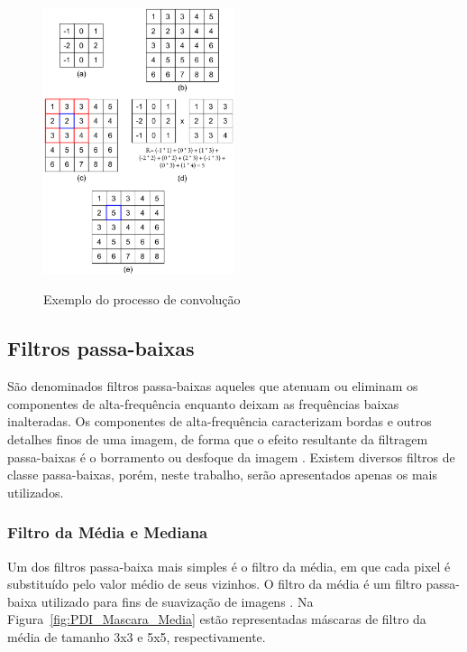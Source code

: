 \documentclass[12pt,oneside,a4paper,english,french,spanish,brazil,]{abntex2}
\begin{document}
\begin{figure}[ht]
\centering
\caption{Exemplo do processo de convolução}
\includegraphics[width=0.5\textwidth]{imagens/PDI_Convolucao.pdf}
\sourceAuthor
\label{fig:PDI_Convolucao}
\end{figure}

\subsection{Filtros passa-baixas}

São denominados filtros passa-baixas aqueles que atenuam ou eliminam os componentes de alta-frequência enquanto deixam as frequências baixas inalteradas. Os componentes de alta-frequência caracterizam bordas e outros detalhes finos de uma imagem, de forma que o efeito resultante da filtragem passa-baixas é o borramento ou desfoque da imagem \cite{gonzalez:2012}. Existem diversos filtros de classe passa-baixas, porém, neste trabalho, serão apresentados apenas os mais utilizados.

\subsubsection{Filtro da Média e Mediana}

Um dos filtros passa-baixa mais simples é o filtro da média, em que cada pixel é substituído pelo valor médio de seus vizinhos. O filtro da média é um filtro passa-baixa utilizado para fins de suavização de imagens \cite{pedrini:2008}. Na Figura~\ref{fig:PDI_Mascara_Media} estão representadas máscaras de filtro da média de tamanho 3x3 e 5x5, respectivamente.
\end{document}
